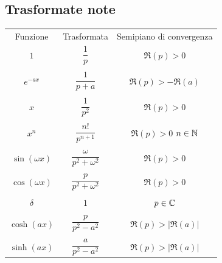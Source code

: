 \documentclass[10pt, letterpaper]{report}
\begin{document}
\subsection{Trasformate note}
\begin{center}
    \begin{tabular}{ccc}
        \rowcolor[HTML]{C0C0C0} 
        Funzione & Trasformata & Semipiano di convergenza \\ 
        \rowcolor[HTML]{EFEFEF} 
        $1$        & $\dfrac{1}{p}$          & $\Re(p)>0$        \\ 
        \rowcolor[HTML]{EFEFEF} 
                &            &         \\ 
        \rowcolor[HTML]{EFEFEF} 
        $e^{-ax}$        & $\dfrac{1}{p+a}$            & $\Re(p)>-\Re(a)$         \\  
        \rowcolor[HTML]{EFEFEF} 
                &            &         \\ 
        \rowcolor[HTML]{EFEFEF} 
        $x$        & $\dfrac{1}{p^2}$           & $\Re(p)>0$           \\  
        \rowcolor[HTML]{EFEFEF} 
                &            &         \\ 
        \rowcolor[HTML]{EFEFEF} 
        $x^n$        &  $\dfrac{n!}{p^{n+1}}$         & $\Re(p)>0$  $n\in{\mathbb N}$       \\  
        \rowcolor[HTML]{EFEFEF} 
                &            &         \\ 
        \rowcolor[HTML]{EFEFEF} 
        $\sin(\omega x)$        & $\dfrac{\omega}{p^2+\omega^2}$           & $\Re(p)>0$            \\  
        \rowcolor[HTML]{EFEFEF} 
                &            &         \\ 
        \rowcolor[HTML]{EFEFEF} 
        $\cos(\omega x)$         & $\dfrac{p}{p^2+\omega^2}$                & $\Re(p)>0$            \\  
        \rowcolor[HTML]{EFEFEF} 
                &            &         \\ 
        \rowcolor[HTML]{EFEFEF} 
        $\delta$        & $1$           & $p\in{\mathbb C}$        \\   
        \rowcolor[HTML]{EFEFEF} 
                &            &         \\ 
        \rowcolor[HTML]{EFEFEF} 
       $\cosh(ax)$        & $\dfrac{p}{p^2-a^2}$           & $\Re(p)>|\Re(a)|$          \\  
       \rowcolor[HTML]{EFEFEF} 
               &            &         \\ 
        \rowcolor[HTML]{EFEFEF} 
        $\sinh(ax)$       &  $\dfrac{a}{p^2-a^2}$             & $\Re(p)>|\Re(a)|$         \\ 
        \end{tabular}
\end{center}
\end{document}
